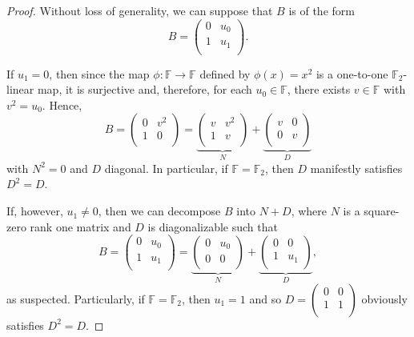 \documentclass{amsart}
\def\FF{\mathbb{F}}
\theoremstyle{definition}
\theoremstyle{remark}
\numberwithin{equation}{section}
\begin{document}
\begin{proof}
Without loss of generality, we can suppose that $B$ is of the form
 $$B=\left(
  \begin{array}{cccc}
    0 & u_0 \\
    1 & u_1  \\
  \end{array}
\right).$$

If $u_1=0$, then since the map $\phi:\FF\to \FF$ defined by $\phi(x)=x^2$ is a one-to-one $\FF_2$-linear map, it is surjective and, therefore, for each $u_0\in \FF$, there exists $v\in \FF$ with $v^2=u_0$. Hence,
$$B=\left(
     \begin{array}{cc}
       0 & v^2 \\
       1 & 0 \\
     \end{array}
   \right)=\underbrace{\left(
     \begin{array}{cc}
       v & v^2 \\
       1 & v \\
     \end{array}
   \right)}_N+\underbrace{\left(
     \begin{array}{cc}
       v & 0 \\
       0 & v \\
     \end{array}
   \right)}_D$$
with $N^2=0$ and $D$ diagonal. In particular, if $\FF=\FF_2$, then $D$ manifestly satisfies $D^2=D$.

If, however, $u_1\ne 0$, then we can decompose $B$ into $N+D$, where $N$ is a square-zero rank one matrix and $D$ is diagonalizable such that
$$B=\left(
     \begin{array}{cc}
       0 & u_0 \\
       1 & u_1 \\
     \end{array}
   \right)=\underbrace{\left(
     \begin{array}{cc}
       0 & u_0 \\
       0 & 0 \\
     \end{array}
   \right)}_N+\underbrace{\left(
     \begin{array}{cc}
       0 & 0 \\
       1 & u_1 \\
     \end{array}
   \right)}_D,$$
as suspected. Particularly, if $\FF=\FF_2$, then $u_1=1$ and so
$D=\left(
                                                                                    \begin{array}{cc}
                                                                                      0 & 0 \\
                                                                                      1 & 1 \\
                                                                                    \end{array}                                                                                  \right)$
obviously satisfies $D^2=D$.
\end{proof}
\end{document}
